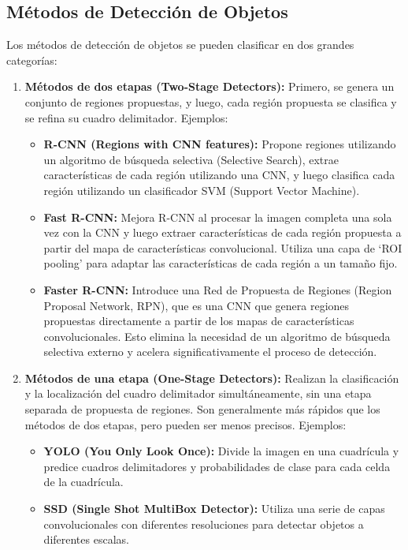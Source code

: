 \documentclass{article}
\begin{document}
\subsection{Métodos de Detección de Objetos}

Los métodos de detección de objetos se pueden clasificar en dos grandes categorías:

\begin{enumerate}
    \item \textbf{Métodos de dos etapas (Two-Stage Detectors):}  Primero, se genera un conjunto de regiones propuestas, y luego, cada región propuesta se clasifica y se refina su cuadro delimitador.  Ejemplos:
        \begin{itemize}
            \item \textbf{R-CNN (Regions with CNN features):}  Propone regiones utilizando un algoritmo de búsqueda selectiva (Selective Search), extrae características de cada región utilizando una CNN, y luego clasifica cada región utilizando un clasificador SVM (Support Vector Machine).
            \item \textbf{Fast R-CNN:}  Mejora R-CNN al procesar la imagen completa una sola vez con la CNN y luego extraer características de cada región propuesta a partir del mapa de características convolucional.  Utiliza una capa de `ROI pooling' para adaptar las características de cada región a un tamaño fijo.
            \item \textbf{Faster R-CNN:}  Introduce una Red de Propuesta de Regiones (Region Proposal Network, RPN), que es una CNN que genera regiones propuestas directamente a partir de los mapas de características convolucionales.  Esto elimina la necesidad de un algoritmo de búsqueda selectiva externo y acelera significativamente el proceso de detección.
        \end{itemize}
    \item \textbf{Métodos de una etapa (One-Stage Detectors):}  Realizan la clasificación y la localización del cuadro delimitador simultáneamente, sin una etapa separada de propuesta de regiones.  Son generalmente más rápidos que los métodos de dos etapas, pero pueden ser menos precisos.  Ejemplos:
        \begin{itemize}
            \item \textbf{YOLO (You Only Look Once):}  Divide la imagen en una cuadrícula y predice cuadros delimitadores y probabilidades de clase para cada celda de la cuadrícula.
            \item \textbf{SSD (Single Shot MultiBox Detector):}  Utiliza una serie de capas convolucionales con diferentes resoluciones para detectar objetos a diferentes escalas.
        \end{itemize}
\end{enumerate}
\end{document}

